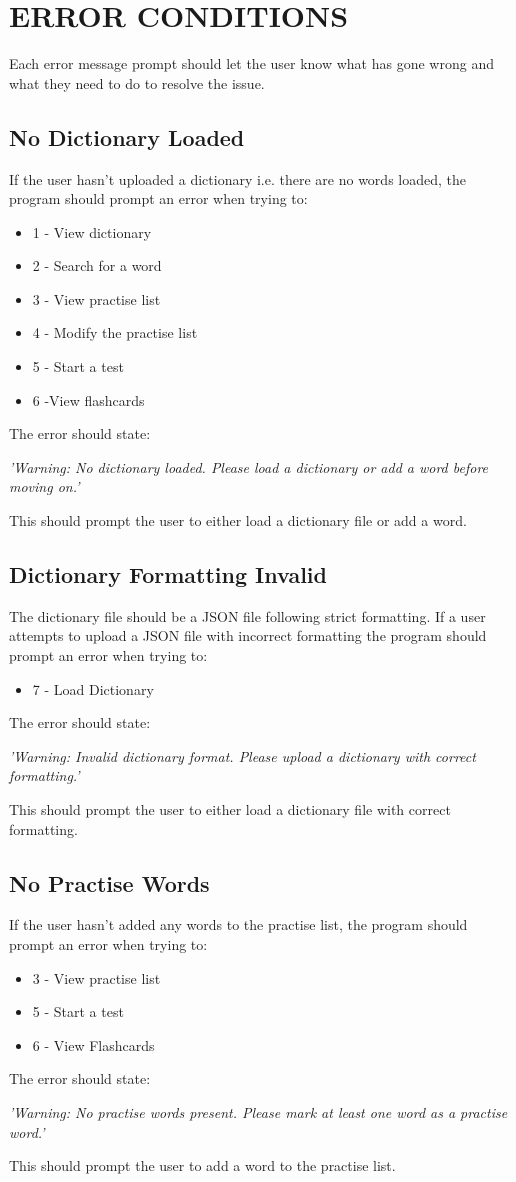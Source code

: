 \documentclass{project}
\begin{document}
\section{ERROR CONDITIONS}
Each error message prompt should let the user know what has gone wrong and what they need to do to resolve the issue.
\subsection{No Dictionary Loaded}
If the user hasn't uploaded a dictionary i.e. there are no words loaded, the program should prompt an error when trying to:
\begin{itemize}
	\item 1 - View dictionary
	\item 2 - Search for a word
	\item 3 - View practise list
	\item 4 - Modify the practise list
	\item 5 - Start a test
	\item 6 -View flashcards
\end{itemize}
The error should state:
\begin{center}
	\emph{'Warning: No dictionary loaded. Please load a dictionary or add a word before moving on.'}
\end{center}
This should prompt the user to either load a dictionary file or add a word.
\subsection{Dictionary Formatting Invalid}
The dictionary file should be a JSON file following strict formatting. If a user attempts to upload a JSON file with incorrect formatting the program should prompt an error when trying to:
\begin{itemize}
	\item 7 - Load Dictionary
\end{itemize}
The error should state:
\begin{center}
	\emph{'Warning: Invalid dictionary format. Please upload a dictionary with correct formatting.'}
\end{center}
This should prompt the user to either load a dictionary file with correct formatting.
\subsection{No Practise Words}
If the user hasn't added any words to the practise list, the program should prompt an error when trying to:
\begin{itemize}
	\item 3 - View practise list
	\item 5 - Start a test
	\item 6 - View Flashcards
	\end{itemize}
The error should state:
\begin{center}
	\emph{'Warning: No practise words present. Please mark at least one word as a practise word.'}
\end{center}
This should prompt the user to add a word to the practise list.
\end{document}

